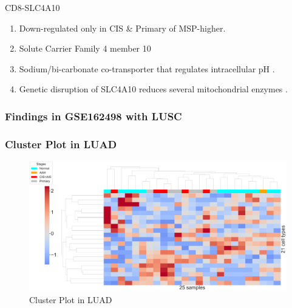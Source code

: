 \documentclass{beamer}
\begin{document}
\begin{frame}[allowframebreaks]
        \begin{block}{CD8-SLC4A10}
            \begin{enumerate}
                \item Down-regulated only in CIS \& Primary of MSP-higher.
                \item Solute Carrier Family 4 member 10
                \item Sodium/bi-carbonate co-transporter that regulates intracellular pH \cite{SLC4A10-1}.
                \item Genetic disruption of SLC4A10 reduces several mitochondrial enzymes \cite{SLC4A10-2}.
            \end{enumerate}
        \end{block}
    \end{frame}

    \begin{frame}[allowframebreaks]
        \frametitle{Findings in GSE162498 with LUSC}
    \end{frame}

    \begin{frame}
        \frametitle{Cluster Plot in LUAD}

        \begin{figure}
            \includegraphics[width=0.9 \linewidth]{figures/BisqueRNA/clustermap/STAR.FPKM.GSE162498.ADC.pdf}
            \caption{Cluster Plot in LUAD}
        \end{figure}
    \end{frame}
\end{document}
